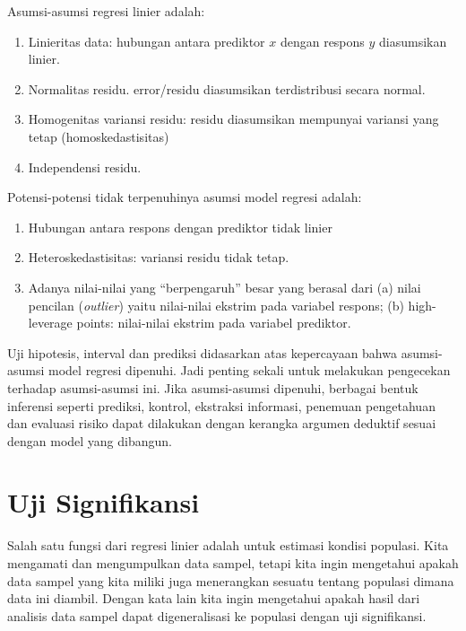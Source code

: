 \documentclass[
]{book}
\providecommand{\tightlist}{%
  \setlength{\itemsep}{0pt}\setlength{\parskip}{0pt}}
\begin{document}
Asumsi-asumsi regresi linier adalah:

\begin{enumerate}
\def\labelenumi{\arabic{enumi}.}
\tightlist
\item
  Linieritas data: hubungan antara prediktor \(x\) dengan respons \(y\)
  diasumsikan linier.
\item
  Normalitas residu. error/residu diasumsikan terdistribusi secara
  normal.
\item
  Homogenitas variansi residu: residu diasumsikan mempunyai variansi
  yang tetap (homoskedastisitas)
\item
  Independensi residu.
\end{enumerate}

Potensi-potensi tidak terpenuhinya asumsi model regresi adalah:

\begin{enumerate}
\def\labelenumi{\arabic{enumi}.}
\tightlist
\item
  Hubungan antara respons dengan prediktor tidak linier
\item
  Heteroskedastisitas: variansi residu tidak tetap.
\item
  Adanya nilai-nilai yang ``berpengaruh'' besar yang berasal dari (a)
  nilai pencilan (\emph{outlier}) yaitu nilai-nilai ekstrim pada variabel
  respons; (b) high-leverage points: nilai-nilai ekstrim pada variabel
  prediktor.
\end{enumerate}

Uji hipotesis, interval dan prediksi didasarkan atas kepercayaan bahwa asumsi-asumsi model regresi dipenuhi. Jadi penting sekali untuk melakukan pengecekan terhadap asumsi-asumsi ini. Jika asumsi-asumsi dipenuhi, berbagai bentuk inferensi seperti prediksi, kontrol, ekstraksi informasi, penemuan pengetahuan dan evaluasi risiko dapat dilakukan dengan kerangka argumen deduktif sesuai dengan model yang dibangun.

\hypertarget{uji-signifikansi}{%
\section{Uji Signifikansi}\label{uji-signifikansi}}

Salah satu fungsi dari regresi linier adalah untuk estimasi kondisi
populasi. Kita mengamati dan mengumpulkan data sampel, tetapi kita ingin
mengetahui apakah data sampel yang kita miliki juga menerangkan sesuatu
tentang populasi dimana data ini diambil. Dengan kata lain kita ingin
mengetahui apakah hasil dari analisis data sampel dapat digeneralisasi
ke populasi dengan uji signifikansi.
\end{document}

